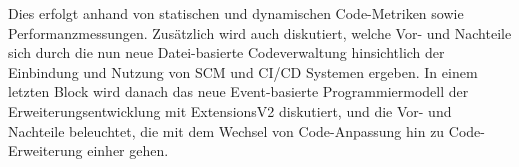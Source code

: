 Dies erfolgt anhand von statischen und dynamischen Code-Metriken sowie Performanzmessungen. Zusätzlich wird auch diskutiert, welche Vor- und Nachteile sich durch die nun neue Datei-basierte Codeverwaltung hinsichtlich der Einbindung und Nutzung von SCM und CI/CD Systemen ergeben. In einem letzten Block wird danach das neue Event-basierte Programmiermodell der Erweiterungsentwicklung mit ExtensionsV2 diskutiert, und die Vor- und Nachteile beleuchtet, die mit dem Wechsel von Code-Anpassung hin zu Code-Erweiterung einher gehen.

